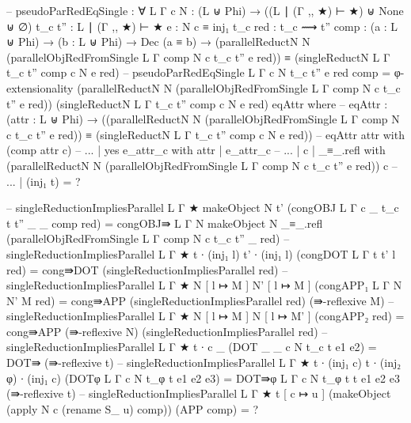 {\begin{code}
  -- pseudoParRedEqSingle : ∀ {L Γ c} {N : (L ⊎ Phi) → ((L ∣ (Γ ,, ★) ⊢ ★) ⊎ None ⊎ ∅)} {t_c t'' : L ∣ (Γ ,, ★) ⊢ ★} {e : N c ≡ inj₁ t_c} {red : t_c ⟿ t''} {comp : (a : L ⊎ Phi) → (b : L ⊎ Phi) → Dec (a ≡ b)} → (parallelReductN N (parallelObjRedFromSingle {L} {Γ} {comp} N c t_c t'' e red)) ≡ (singleReductN {L} {Γ} {t_c} {t''} {comp} c N e red)
  -- pseudoParRedEqSingle {L} {Γ} {c} {N} {t_c} {t''} {e} {red} {comp} = φ-extensionality (parallelReductN N (parallelObjRedFromSingle {L} {Γ} {comp} N c t_c t'' e red)) (singleReductN {L} {Γ} {t_c} {t''} {comp} c N e red) eqAttr where
  --   eqAttr : (attr : L ⊎ Phi) → ((parallelReductN N (parallelObjRedFromSingle {L} {Γ} {comp} N c t_c t'' e red)) ≡ (singleReductN {L} {Γ} {t_c} {t''} {comp} c N e red))
  --   eqAttr attr with (comp attr c)
  --   ... | yes e_attr_c with attr | e_attr_c
  --   ...   | c | _≡_.refl with (parallelReductN N (parallelObjRedFromSingle {L} {Γ} {comp} N c t_c t'' e red)) c
  --   ...     | (inj₁ t) = ?

  -- singleReductionImpliesParallel {L} {Γ} {★} {makeObject N} {t'} (congOBJ {L} {Γ} {c} {_} {t_c} {t} {t''} {_} {_} {comp} red) = congOBJ⇛ {L} {Γ} {N} {makeObject N} {_≡_.refl} (parallelObjRedFromSingle {L} {Γ} {comp} N c t_c t'' _ red)
  -- singleReductionImpliesParallel {L} {Γ} {★} {t ∙ (inj₁ l)} {t' ∙ (inj₁ l)} (congDOT {L} {Γ} {t} {t'} {l} red) = cong⇛DOT (singleReductionImpliesParallel red)
  -- singleReductionImpliesParallel {L} {Γ} {★} {N [ l ↦ M ]} {N' [ l ↦ M ]} (congAPP₁ {L} {Γ} {N} {N'} {M} red) = cong⇛APP (singleReductionImpliesParallel red) (⇛-reflexive M)
  -- singleReductionImpliesParallel {L} {Γ} {★} {N [ l ↦ M ]} {N [ l ↦ M' ]} (congAPP₂ red) = cong⇛APP (⇛-reflexive N) (singleReductionImpliesParallel red)
  -- singleReductionImpliesParallel {L} {Γ} {★} { t ∙ c } {_} (DOT {_} {_} {c} {N} {t_c} {t} {e1} {e2}) = DOT⇛ (⇛-reflexive t)
  -- singleReductionImpliesParallel {L} {Γ} {★} {t ∙ (inj₁ c)} {t ∙ (inj₂ φ) ∙ (inj₁ c)} (DOTφ {L} {Γ} {c} {N} {t_φ} {t} {e1} {e2} {e3}) = DOT⇛φ {L} {Γ} {c} {N} {t_φ} {t} {t} {e1} {e2} {e3} (⇛-reflexive t)
  -- singleReductionImpliesParallel {L} {Γ} {★} {t [ c ↦ u ]} {(makeObject (apply N c (rename S_ u) comp))} (APP comp) = ?

\end{code}}   